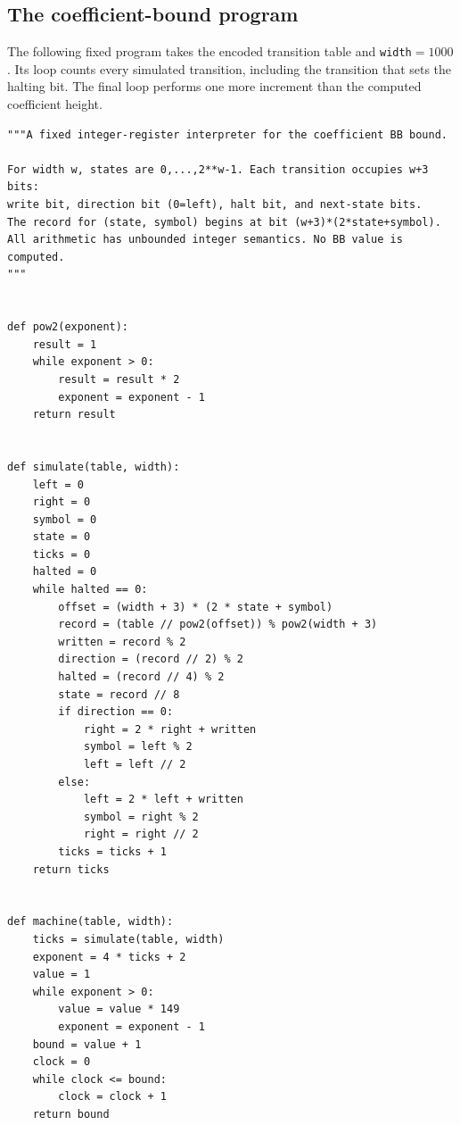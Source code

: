 \subsection{The coefficient-bound program}\label{q198bb:coefficient-program}
The following fixed program takes the encoded transition table and
\texttt{width}$=1000$. Its loop counts every simulated transition,
including the transition that sets the halting bit. The final loop
performs one more increment than the computed coefficient height.
\begingroup\small
\begin{verbatim}
"""A fixed integer-register interpreter for the coefficient BB bound.

For width w, states are 0,...,2**w-1. Each transition occupies w+3 bits:
write bit, direction bit (0=left), halt bit, and next-state bits.
The record for (state, symbol) begins at bit (w+3)*(2*state+symbol).
All arithmetic has unbounded integer semantics. No BB value is computed.
"""


def pow2(exponent):
    result = 1
    while exponent > 0:
        result = result * 2
        exponent = exponent - 1
    return result


def simulate(table, width):
    left = 0
    right = 0
    symbol = 0
    state = 0
    ticks = 0
    halted = 0
    while halted == 0:
        offset = (width + 3) * (2 * state + symbol)
        record = (table // pow2(offset)) % pow2(width + 3)
        written = record % 2
        direction = (record // 2) % 2
        halted = (record // 4) % 2
        state = record // 8
        if direction == 0:
            right = 2 * right + written
            symbol = left % 2
            left = left // 2
        else:
            left = 2 * left + written
            symbol = right % 2
            right = right // 2
        ticks = ticks + 1
    return ticks


def machine(table, width):
    ticks = simulate(table, width)
    exponent = 4 * ticks + 2
    value = 1
    while exponent > 0:
        value = value * 149
        exponent = exponent - 1
    bound = value + 1
    clock = 0
    while clock <= bound:
        clock = clock + 1
    return bound
\end{verbatim}
\endgroup
